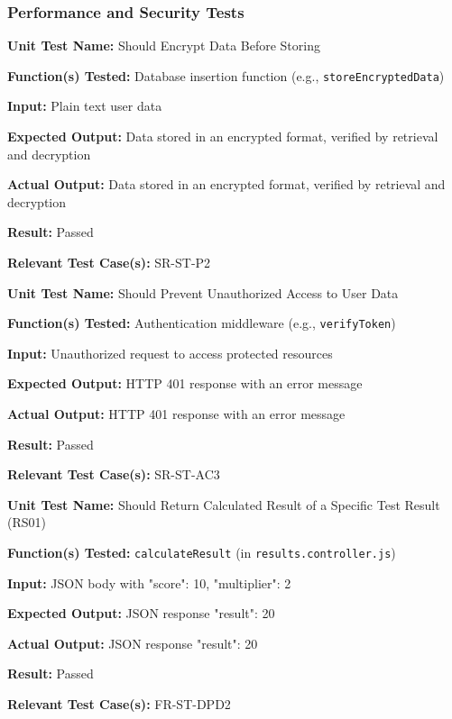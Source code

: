\documentclass[12pt, titlepage]{article}
\begin{document}
\subsubsection{Performance and Security Tests}

\begin{mdframed}[linewidth=0.5mm]
\textbf{Unit Test Name:} Should Encrypt Data Before Storing \par
\textbf{Function(s) Tested:} Database insertion function (e.g., \texttt{storeEncryptedData}) \par
\textbf{Input:} Plain text user data \par
\textbf{Expected Output:} Data stored in an encrypted format, verified by retrieval and decryption \par
\textbf{Actual Output:} Data stored in an encrypted format, verified by retrieval and decryption \par
\textbf{Result:} Passed \par
\textbf{Relevant Test Case(s):} SR-ST-P2
\end{mdframed}

\begin{mdframed}[linewidth=0.5mm]
\textbf{Unit Test Name:} Should Prevent Unauthorized Access to User Data \par
\textbf{Function(s) Tested:} Authentication middleware (e.g., \texttt{verifyToken}) \par
\textbf{Input:} Unauthorized request to access protected resources \par
\textbf{Expected Output:} HTTP 401 response with an error message \par
\textbf{Actual Output:} HTTP 401 response with an error message \par
\textbf{Result:} Passed \par
\textbf{Relevant Test Case(s):} SR-ST-AC3
\end{mdframed}

\begin{mdframed}[linewidth=0.5mm]
  \textbf{Unit Test Name:} Should Return Calculated Result of a Specific Test Result (RS01) \par
  \textbf{Function(s) Tested:} \texttt{calculateResult} (in \texttt{results.controller.js}) \par
  \textbf{Input:} JSON body with {"score": 10, "multiplier": 2} \par
  \textbf{Expected Output:} JSON response {"result": 20} \par
  \textbf{Actual Output:} JSON response {"result": 20} \par
  \textbf{Result:} Passed \par
  \textbf{Relevant Test Case(s):} FR-ST-DPD2
  \end{mdframed}
\end{document}
